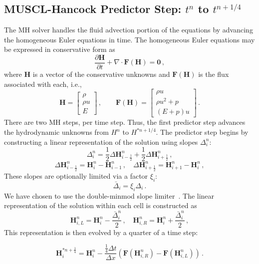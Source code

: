 \documentclass[preprint,12pt]{elsarticle}
\newcommand{\dydt}[1]{\frac{\partial #1}{\partial t}}
\newcommand{\pec}{\, ,}
\newcommand{\pep}{\, .}
\newcommand{\half}{\frac{1}{2}}
\newcommand{\fourth}{\frac{1}{4}}
\newcommand{\E}{{E_r}}
\renewcommand{\H}{\mathbf{H}}
\newcommand{\Flux}{\mathbf{F}}
\newcommand{\dt}{\Delta t}
\newcommand{\dx}{\Delta x}
\newcommand{\iL}{_{i,L}}
\newcommand{\iR}{_{i,R}}
\newcommand{\hydroPredictor}[4]{
\begin{equation}#4
  \H_i^{#2} = \H_i^{#1} - \frac{#3\dt}{\dx}
  \left(\Flux(\H\iR^{#1}) - \Flux(\H\iL^{#1})\right) \pep
\end{equation}
}
\begin{document}
\subsection{MUSCL-Hancock Predictor Step: $t^n$ to $t^{n+1/4}$}
The MH solver handles the fluid advection portion of the equations by advancing the homogeneous Euler equations
in time.   The homogeneous Euler equations may be expressed in conservative form as
\begin{equation}
  \dydt{\H} + \nabla\cdot\Flux(\H) = \mathbf{0} \pec
\end{equation}
where $\H$ is a vector of the conservative unknowns
and $\Flux(\H)$ is the flux associated with each, i.e.,
\begin{equation}
  \H=\left[\begin{array}{c}\rho\\\rho u\\E\end{array}\right] \pec\qquad
  \Flux(\H)=\left[\begin{array}{c}\rho u\\
  \rho u^2 + p\\
  (E+p)u\end{array}\right] \pep
\end{equation}
There are two MH steps, per time step. Thus, the first predictor step advances the hydrodynamic unknowns
from $H^{n}$ to $H^{*n+1/4}$.
The predictor step begins by constructing a linear representation of the solution
using slopes $\Delta_i^n$:
\begin{equation}\label{eq:muscl_slopes}
  \Delta_i^n = \half\Delta\H_{i-\half}^n + \half\Delta\H_{i+\half}^n \pec
\end{equation}
\begin{equation}\label{eq:muscl_differences}
  \Delta\H_{i-\half}^n = \H_i^n - \H_{i-1}^n \pec\quad
  \Delta\H_{i+\half}^n = \H_{i+1}^n - \H_i^n \pec
\end{equation}
These slopes are optionally limited via a factor $\xi_i$:
\begin{equation}
  \bar{\Delta}_i = \xi_i \Delta_i \pep
\end{equation}
We have chosen to use the double-minmod slope limiter~\cite{ref???}.
The linear representation
of the solution within each cell is constructed as
\begin{equation}\label{eq:edge_hydro}
  \H\iL^n = \H_i^n - \frac{\bar{\Delta}_i^n}{2} \pec
  \quad
  \H\iR^n = \H_i^n + \frac{\bar{\Delta}_i^n}{2} \pec
\end{equation}
This representation is then evolved by a quarter of a time step:
\hydroPredictor{n}{*n+\fourth}{\fourth}{\label{eq:muscl_predictor}}
\end{document}
